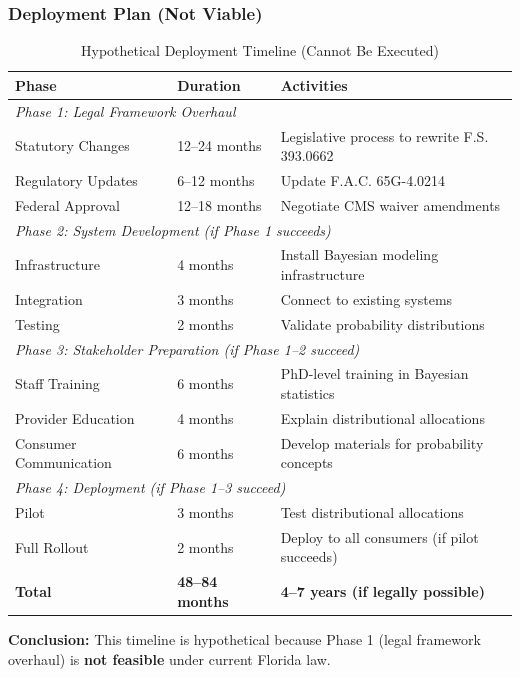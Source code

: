 \subsubsection{Deployment Plan (Not Viable)}

\begin{table}[h]
\centering
\caption{Hypothetical Deployment Timeline (Cannot Be Executed)}
\begin{tabular}{lll}
\toprule
\textbf{Phase} & \textbf{Duration} & \textbf{Activities} \\
\midrule
\multicolumn{3}{l}{\textit{Phase 1: Legal Framework Overhaul}} \\
Statutory Changes & 12--24 months & Legislative process to rewrite F.S. 393.0662 \\
Regulatory Updates & 6--12 months & Update F.A.C. 65G-4.0214 \\
Federal Approval & 12--18 months & Negotiate CMS waiver amendments \\
\midrule
\multicolumn{3}{l}{\textit{Phase 2: System Development (if Phase 1 succeeds)}} \\
Infrastructure & 4 months & Install Bayesian modeling infrastructure \\
Integration & 3 months & Connect to existing systems \\
Testing & 2 months & Validate probability distributions \\
\midrule
\multicolumn{3}{l}{\textit{Phase 3: Stakeholder Preparation (if Phase 1--2 succeed)}} \\
Staff Training & 6 months & PhD-level training in Bayesian statistics \\
Provider Education & 4 months & Explain distributional allocations \\
Consumer Communication & 6 months & Develop materials for probability concepts \\
\midrule
\multicolumn{3}{l}{\textit{Phase 4: Deployment (if Phase 1--3 succeed)}} \\
Pilot & 3 months & Test distributional allocations \\
Full Rollout & 2 months & Deploy to all consumers (if pilot succeeds) \\
\midrule
\textbf{Total} & \textbf{48--84 months} & \textbf{4--7 years (if legally possible)} \\
\bottomrule
\end{tabular}
\end{table}

\textbf{Conclusion:} This timeline is hypothetical because Phase 1 (legal framework overhaul) is \textbf{not feasible} under current Florida law.

